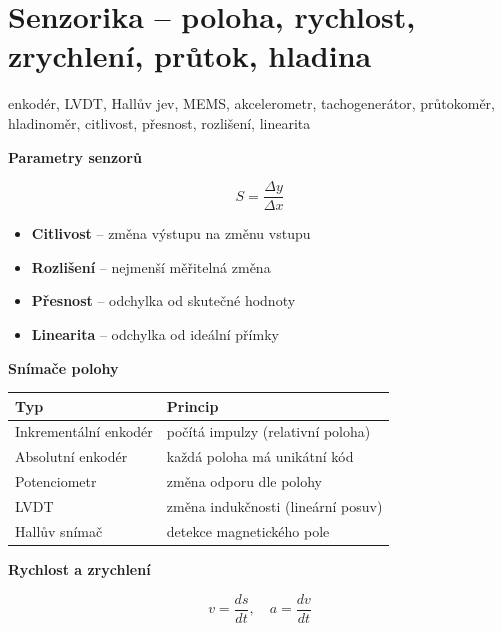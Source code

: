 \documentclass[a4paper,10pt]{article}
\begin{document}
\newpage


\section{Senzorika -- poloha, rychlost, zrychlení, průtok, hladina}

\begin{pojmybox}
enkodér, LVDT, Hallův jev, MEMS, akcelerometr,
tachogenerátor, průtokoměr, hladinoměr,
citlivost, přesnost, rozlišení, linearita
\end{pojmybox}

\begin{vysvetlenibox}

\textbf{Parametry senzorů}

\begin{vzorcebox}
\[
S = \frac{\Delta y}{\Delta x}
\]
\end{vzorcebox}

\begin{itemize}
\item \textbf{Citlivost} – změna výstupu na změnu vstupu
\item \textbf{Rozlišení} – nejmenší měřitelná změna
\item \textbf{Přesnost} – odchylka od skutečné hodnoty
\item \textbf{Linearita} – odchylka od ideální přímky
\end{itemize}

\textbf{Snímače polohy}

\begin{tabularx}{\linewidth}{l X}
\toprule
Typ & Princip \\
\midrule
Inkrementální enkodér & počítá impulzy (relativní poloha) \\
Absolutní enkodér & každá poloha má unikátní kód \\
Potenciometr & změna odporu dle polohy \\
LVDT & změna indukčnosti (lineární posuv) \\
Hallův snímač & detekce magnetického pole \\
\bottomrule
\end{tabularx}

\textbf{Rychlost a zrychlení}

\begin{vzorcebox}
\[
v = \frac{ds}{dt}, \quad a = \frac{dv}{dt}
\]
\end{vzorcebox}


\end{vysvetlenibox}
\end{document}
